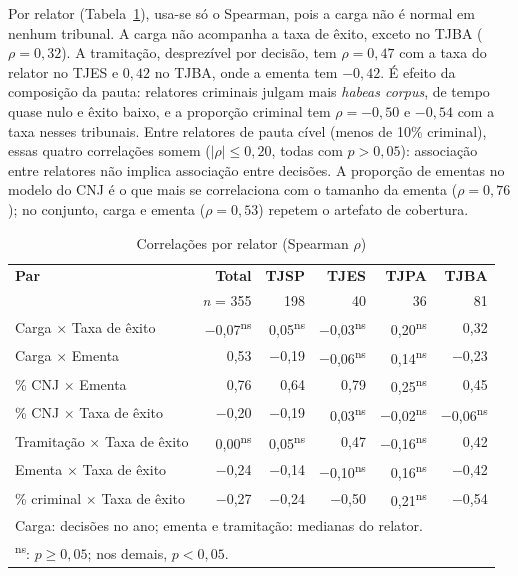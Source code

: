 \documentclass[conference]{IEEEtran}
\begin{document}
Por relator (Tabela~\ref{tab:corrrelator}), usa-se só o Spearman, pois a carga
não é normal em nenhum tribunal. A carga não acompanha a taxa de êxito, exceto
no TJBA ($\rho = 0{,}32$). A tramitação, desprezível por decisão, tem
$\rho = 0{,}47$ com a taxa do relator no TJES e $0{,}42$ no TJBA, onde a ementa
tem $-0{,}42$. É efeito da composição da pauta: relatores criminais julgam mais
\emph{habeas corpus}, de tempo quase nulo e êxito baixo, e a proporção criminal
tem $\rho = -0{,}50$ e $-0{,}54$ com a taxa nesses tribunais. Entre relatores de
pauta cível (menos de 10\% criminal), essas quatro correlações somem
($|\rho| \le 0{,}20$, todas com $p > 0{,}05$): associação entre relatores não
implica associação entre decisões. A proporção de ementas no modelo do CNJ é o
que mais se correlaciona com o tamanho da ementa ($\rho = 0{,}76$); no
conjunto, carga e ementa ($\rho = 0{,}53$) repetem o artefato de cobertura.

\begin{table}[!t]
\caption{Correlações por relator (Spearman $\rho$)}
\label{tab:corrrelator}
\centering
\scriptsize
\setlength{\tabcolsep}{2.5pt}
\begin{tabular}{lrrrrr}
\hline
\textbf{Par} & \textbf{Total} & \textbf{TJSP} & \textbf{TJES} & \textbf{TJPA} & \textbf{TJBA} \\
 & \textit{n} = 355 & 198 & 40 & 36 & 81 \\
\hline
Carga $\times$ Taxa de êxito         & $-$0,07\textsuperscript{ns} & 0,05\textsuperscript{ns} & $-$0,03\textsuperscript{ns} & 0,20\textsuperscript{ns} & 0,32 \\
Carga $\times$ Ementa                & 0,53 & $-$0,19 & $-$0,06\textsuperscript{ns} & 0,14\textsuperscript{ns} & $-$0,23 \\
\% CNJ $\times$ Ementa               & 0,76 & 0,64 & 0,79 & 0,25\textsuperscript{ns} & 0,45 \\
\% CNJ $\times$ Taxa de êxito        & $-$0,20 & $-$0,19 & 0,03\textsuperscript{ns} & $-$0,02\textsuperscript{ns} & $-$0,06\textsuperscript{ns} \\
Tramitação $\times$ Taxa de êxito    & 0,00\textsuperscript{ns} & 0,05\textsuperscript{ns} & 0,47 & $-$0,16\textsuperscript{ns} & 0,42 \\
Ementa $\times$ Taxa de êxito        & $-$0,24 & $-$0,14 & $-$0,10\textsuperscript{ns} & 0,16\textsuperscript{ns} & $-$0,42 \\
\% criminal $\times$ Taxa de êxito   & $-$0,27 & $-$0,24 & $-$0,50 & 0,21\textsuperscript{ns} & $-$0,54 \\
\hline
\multicolumn{6}{l}{\scriptsize Carga: decisões no ano; ementa e tramitação: medianas do relator.}\\
\multicolumn{6}{l}{\scriptsize \textsuperscript{ns}: $p \geq 0{,}05$; nos demais, $p < 0{,}05$.}
\end{tabular}
\end{table}
\end{document}
